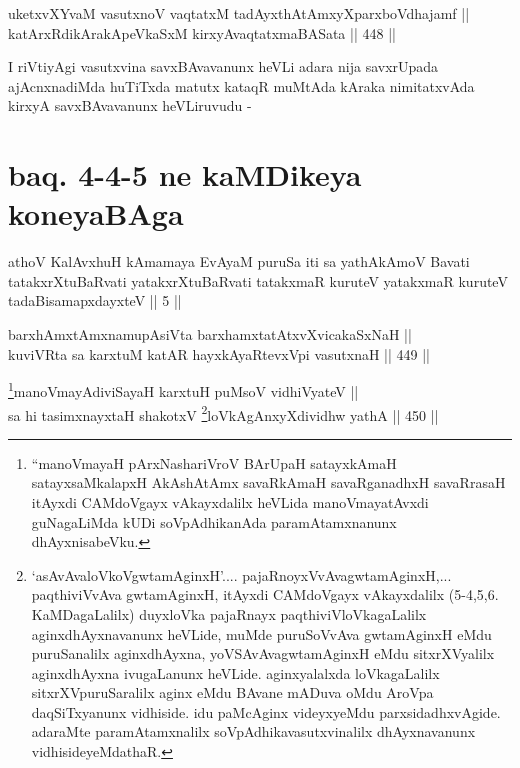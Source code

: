 
\begin{shl}
uketxvXYvaM vasutxnoV vaqtatxM tadAyxthAtAmxyXparxboVdhajamf || \\
katArxRdikArakApeVkaSxM kirxyAvaqtatxmaBASata \hfill || 448 ||  
\end{shl}

\begin{artha}
I riVtiyAgi vasutxvina savxBAvavanunx heVLi adara nija savxrUpada
ajAcnxnadiMda huTiTxda matutx kataqR muMtAda kAraka nimitatxvAda
kirxyA savxBAvavanunx heVLiruvudu -
\end{artha}

\section*{baq. 4-4-5 ne kaMDikeya koneyaBAga}

\begin{shl}
athoV KalAvxhuH kAmamaya EvAyaM puruSa iti sa yathAkAmoV Bavati tatakxrXtuBaRvati yatakxrXtuBaRvati tatakxmaR kuruteV yatakxmaR kuruteV tadaBisamapxdayxteV || 5 ||
\end{shl}

\begin{shl}
barxhAmxtAmxnamupAsiVta barxhamxtatAtxvXvicakaSxNaH ||  \\
kuviVRta sa karxtuM katAR hayxkAyaRtevxV\s pi vasutxnaH \hfill || 449 ||  
\end{shl}

\begin{shl}
\footnote{``manoVmayaH pArxNashariVroV BArUpaH satayxkAmaH
satayxsaMkalapxH AkAshAtAmx savaRkAmaH savaRganadhxH savaRrasaH
itAyxdi CAMdoVgayx vAkayxdalilx heVLida manoVmayatAvxdi
guNagaLiMda kUDi soVpAdhikanAda paramAtamxnanunx
dhAyxnisabeVku.}manoVmayAdiviSayaH karxtuH puMsoV vidhiVyateV || \\
sa hi tasimxnayxtaH shakotxV \footnote{`asAvAvaloVkoVgwtamAginxH'.... pajaRnoyxVvAvagwtamAginxH,... paqthiviVvAva
gwtamAginxH, itAyxdi CAMdoVgayx vAkayxdalilx (5-4,5,6. KaMDagaLalilx)
duyxloVka pajaRnayx paqthiviVloVkagaLalilx aginxdhAyxnavanunx
heVLide, muMde puruSoVvAva gwtamAginxH eMdu puruSanalilx aginxdhAyxna,
yoVSAvAvagwtamAginxH eMdu sitxrXVyalilx aginxdhAyxna ivugaLanunx
heVLide. aginxyalalxda loVkagaLalilx sitxrXVpuruSaralilx aginx eMdu
BAvane mADuva oMdu AroVpa daqSiTxyanunx vidhiside. idu paMcAginx
videyxyeMdu parxsidadhxvAgide. adaraMte paramAtamxnalilx
soVpAdhikavasutxvinalilx dhAyxnavanunx vidhisideyeMdathaR.}loVkAgAnxyXdividhw yathA \hfill || 450 || 
\end{shl}



